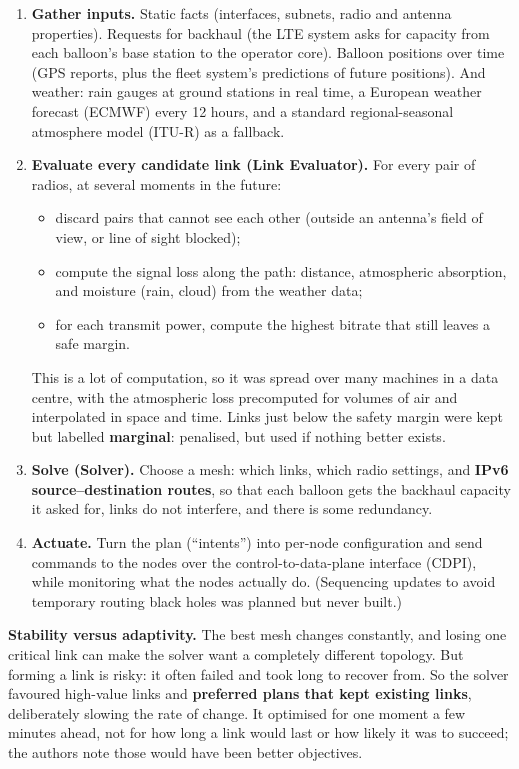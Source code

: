 \begin{enumerate}
  \item \textbf{Gather inputs.} Static facts (interfaces, subnets, radio and antenna properties). Requests for backhaul (the LTE system asks for capacity from each balloon's
        base station to the operator core). Balloon positions over time (GPS reports, plus the fleet system's predictions of future positions). And weather: rain gauges at
        ground stations in real time, a European weather forecast (ECMWF) every 12 hours, and a standard regional-seasonal atmosphere model (ITU-R) as a fallback.
  \item \textbf{Evaluate every candidate link (Link Evaluator).} For every pair of radios, at several moments in the future:
        \begin{itemize}
          \item discard pairs that cannot see each other (outside an antenna's field of view, or line of sight blocked);
          \item compute the signal loss along the path: distance, atmospheric absorption, and moisture (rain, cloud) from the weather data;
          \item for each transmit power, compute the highest bitrate that still leaves a safe margin.
        \end{itemize}
        This is a lot of computation, so it was spread over many machines in a data centre, with the atmospheric loss precomputed for volumes of air and interpolated in space
        and time. Links just below the safety margin were kept but labelled \textbf{marginal}: penalised, but used if nothing better exists.
  \item \textbf{Solve (Solver).} Choose a mesh: which links, which radio settings, and \textbf{IPv6 source--destination routes}, so that each balloon gets the backhaul
        capacity it asked for, links do not interfere, and there is some redundancy.
  \item \textbf{Actuate.} Turn the plan (``intents'') into per-node configuration and send commands to the nodes over the control-to-data-plane interface (CDPI), while
        monitoring what the nodes actually do. (Sequencing updates to avoid temporary routing black holes was planned but never built.)
\end{enumerate}

\textbf{Stability versus adaptivity.} The best mesh changes constantly, and losing one critical link can make the solver want a completely different topology. But forming
a link is risky: it often failed and took long to recover from. So the solver favoured high-value links and \textbf{preferred plans that kept existing links},
deliberately slowing the rate of change. It optimised for one moment a few minutes ahead, not for how long a link would last or how likely it was to succeed; the authors note
those would have been better objectives.

